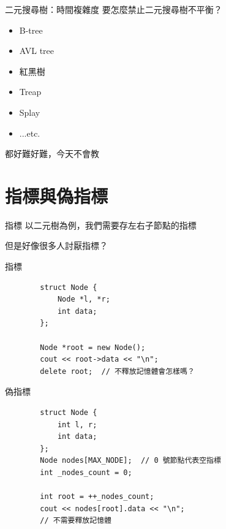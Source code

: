\documentclass[aspectratio=169]{beamer}
\begin{document}
\begin{frame}{二元搜尋樹：時間複雜度}
    要怎麼禁止二元搜尋樹不平衡？

    \begin{itemize}
        \item B-tree
        \item AVL tree
        \item 紅黑樹
        \item Treap
        \item Splay
        \item ...etc.
    \end{itemize}

    都好難好難，今天不會教
\end{frame}


\section{指標與偽指標}

\begin{frame}{指標}
    以二元樹為例，我們需要存左右子節點的指標

    但是好像很多人討厭指標？
\end{frame}

\begin{frame}[fragile]{指標}
    \begin{verbatim}
        struct Node {
            Node *l, *r;
            int data;
        };

        Node *root = new Node();
        cout << root->data << "\n";
        delete root;  // 不釋放記憶體會怎樣嗎？
    \end{verbatim}
\end{frame}

\begin{frame}[fragile]{偽指標}
    \begin{verbatim}
        struct Node {
            int l, r;
            int data;
        };
        Node nodes[MAX_NODE];  // 0 號節點代表空指標
        int _nodes_count = 0;

        int root = ++_nodes_count;
        cout << nodes[root].data << "\n";
        // 不需要釋放記憶體
    \end{verbatim}
\end{frame}
\end{document}
